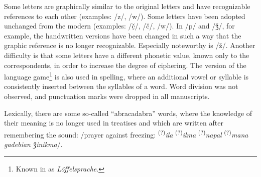 \documentclass[output=paper,colorlinks,citecolor=brown,arabicfont,georgian]{langscibook}
\begin{document}
Some letters are graphically similar to the original letters and have recognizable references to each other (examples: /z/, /w/). Some letters have been adopted unchanged from the modern   (examples: /č̣/, /č/, /w/). In /p/ and /ǯ/, for example, the handwritten versions have been changed in such a way that the graphic reference is no longer recognizable. Especially noteworthy is /ž/. 
Another difficulty is that some letters have a different phonetic value, known only to the correspondents, in order to increase the degree of ciphering. The  version of the language game\footnote{%
Known in  as \textit{Löffelsprache}.} is also used in spelling, where an additional vowel or syllable is consistently inserted between the syllables of a word. Word division was not observed, and punctuation marks were dropped in all manuscripts.

Lexically, there are some so-called ``abracadabra'' words, where the knowledge of their meaning is no longer used in treatises and which are written after remembering the sound: /prayer against freezing: \textsuperscript{(?)}\textit{ila} \textsuperscript{(?)}\textit{ilma} \textsuperscript{(?)}\textit{napal} \textsuperscript{(?)}\textit{mana gadebian ǯinikma}/.
\end{document}
